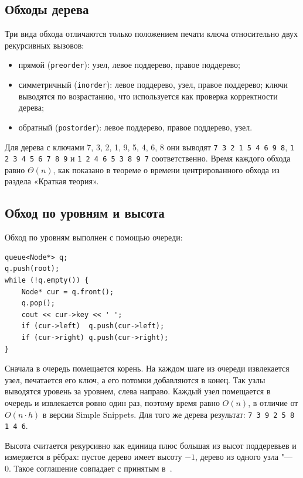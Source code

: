 \documentclass[otchet]{SCWorks}
\begin{document}
\subsection{Обходы дерева}

Три вида обхода отличаются только положением печати ключа относительно
двух рекурсивных вызовов:
\begin{itemize}
  \item прямой (\texttt{preorder}): узел, левое поддерево, правое поддерево;
  \item симметричный (\texttt{inorder}): левое поддерево, узел, правое
        поддерево; ключи выводятся по возрастанию, что используется как
        проверка корректности дерева;
  \item обратный (\texttt{postorder}): левое поддерево, правое поддерево,
        узел.
\end{itemize}
Для дерева с ключами 7, 3, 2, 1, 9, 5, 4, 6, 8 они выводят
\texttt{7 3 2 1 5 4 6 9 8}, \texttt{1 2 3 4 5 6 7 8 9} и
\texttt{1 2 4 6 5 3 8 9 7} соответственно. Время каждого обхода равно
$\Theta(n)$, как показано в теореме о времени центрированного обхода из раздела «Краткая теория».

\subsection{Обход по уровням и высота}

Обход по уровням выполнен с помощью очереди:

\begin{verbatim}
queue<Node*> q;
q.push(root);
while (!q.empty()) {
    Node* cur = q.front();
    q.pop();
    cout << cur->key << ' ';
    if (cur->left)  q.push(cur->left);
    if (cur->right) q.push(cur->right);
}
\end{verbatim}

Сначала в очередь помещается корень. На каждом шаге из очереди
извлекается узел, печатается его ключ, а его потомки добавляются в конец.
Так узлы выводятся уровень за уровнем, слева направо. Каждый узел
помещается в очередь и извлекается ровно один раз, поэтому время равно
$O(n)$, в отличие от $O(n \cdot h)$ в версии Simple Snippets. Для того же
дерева результат: \texttt{7 3 9 2 5 8 1 4 6}.

Высота считается рекурсивно как единица плюс большая из высот поддеревьев
и измеряется в рёбрах: пустое дерево имеет высоту $-1$, дерево из одного
узла "--- 0. Такое соглашение совпадает с принятым в~\cite{kormen}.
\end{document}
